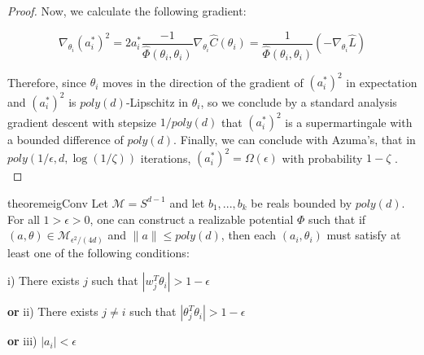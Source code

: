 \documentclass{article}
\begin{document}
\begin{proof}
Now, we calculate the following gradient: 

\begin{equation}
\nabla_{\theta_i} (a_i^*)^2 = 2a_i^*\frac{-1}{\widehat{\Phi}(\theta_i,\theta_i)} \nabla_{\theta_i} \widehat{C}(\theta_i) = \frac{1}{\widehat{\Phi}(\theta_i,\theta_i)} (-\nabla_{\theta_i} \widehat{L})
\end{equation}

Therefore, since $\theta_i$ moves in the direction of the gradient of $(a_i^*)^2$ in expectation and $(a_i^*)^2$ is $poly(d)$-Lipschitz in $\theta_i$, so we conclude by a standard analysis gradient descent with stepsize $1/poly(d)$ that $(a_i^*)^2$ is a supermartingale with a bounded difference of $poly(d)$. Finally, we can conclude with Azuma's, that in $poly(1/\epsilon,d,\log(1/\zeta))$ iterations, $(a_i^*)^2 = \Omega(\epsilon)$ with probability $1-\zeta$ .\\
\end{proof}

\begin{restatable}{theorem}{eigConv}
\label{eigConv}
Let $\mathcal{M} = S^{d-1}$ and let $b_1,...,b_k$ be reals bounded by $poly(d)$. For all $ 1 > \epsilon > 0$, one can construct a realizable potential $\Phi$ such that if $(a,\theta) \in \mathcal{M}_{\epsilon^2/(4d)}$ and $\|a\| \leq poly(d)$, then each $(a_i, \theta_i)$ must satisfy at least one of the following conditions:


i) There exists $j$ such that $|w_j^T\theta_i| > 1- \epsilon$ 

{\bf or} ii) There exists $j\neq i$ such that $|\theta_j^T\theta_i| > 1- \epsilon$ 

{\bf or} iii) $|a_i| < \epsilon$\\

\end{restatable}
\end{document}
